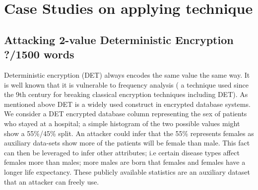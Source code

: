\documentclass[journal]{IEEEtran}
\begin{document}
 
\section{Case Studies on applying technique}
\subsection{Attacking 2-value Deterministic Encryption ?/1500 words}
Deterministic encryption (DET) always encodes the same value the same way. It is well known that it is vulnerable to frequency analysis ( a technique used since the 9th century\cite{Arab} for breaking classical encryption techniques including DET). As mentioned above DET is a widely used construct in encrypted database systems. We consider a DET encrypted database column representing the sex of patients who stayed at a hospital; a simple histogram of the two possible values might show a 55\%/45\% split. An attacker could infer that the 55\% represents females as auxiliary data-sets show more of the patients will be female \cite{InfrenceAttacks} than male. This fact can then be leveraged to infer other attributes; i.e certain disease types affect females more than males; more males are born that females and females have a longer life expectancy. These publicly available statistics are an auxiliary dataset that an attacker can freely use. 
\end{document}
